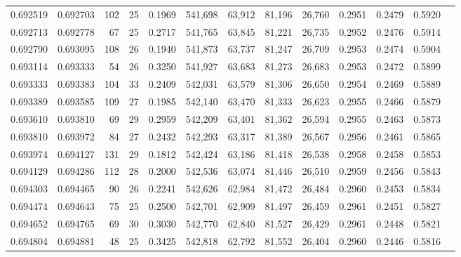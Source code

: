 \begin{tabular}{rrrrrrrrrrrrr}
0.692519 & 0.692703 &    102 &    25 &                                     0.1969 & 541,698 &  63,912 &  81,196 &  26,760 & 0.2951 & 0.2479 & 0.5920 \\
0.692713 & 0.692778 &     67 &    25 &                                     0.2717 & 541,765 &  63,845 &  81,221 &  26,735 & 0.2952 & 0.2476 & 0.5914 \\
0.692790 & 0.693095 &    108 &    26 &                                     0.1940 & 541,873 &  63,737 &  81,247 &  26,709 & 0.2953 & 0.2474 & 0.5904 \\
0.693114 & 0.693333 &     54 &    26 &                                     0.3250 & 541,927 &  63,683 &  81,273 &  26,683 & 0.2953 & 0.2472 & 0.5899 \\
0.693333 & 0.693383 &    104 &    33 &                                     0.2409 & 542,031 &  63,579 &  81,306 &  26,650 & 0.2954 & 0.2469 & 0.5889 \\
0.693389 & 0.693585 &    109 &    27 &                                     0.1985 & 542,140 &  63,470 &  81,333 &  26,623 & 0.2955 & 0.2466 & 0.5879 \\
0.693610 & 0.693810 &     69 &    29 &                                     0.2959 & 542,209 &  63,401 &  81,362 &  26,594 & 0.2955 & 0.2463 & 0.5873 \\
0.693810 & 0.693972 &     84 &    27 &                                     0.2432 & 542,293 &  63,317 &  81,389 &  26,567 & 0.2956 & 0.2461 & 0.5865 \\
0.693974 & 0.694127 &    131 &    29 &                                     0.1812 & 542,424 &  63,186 &  81,418 &  26,538 & 0.2958 & 0.2458 & 0.5853 \\
0.694129 & 0.694286 &    112 &    28 &                                     0.2000 & 542,536 &  63,074 &  81,446 &  26,510 & 0.2959 & 0.2456 & 0.5843 \\
0.694303 & 0.694465 &     90 &    26 &                                     0.2241 & 542,626 &  62,984 &  81,472 &  26,484 & 0.2960 & 0.2453 & 0.5834 \\
0.694474 & 0.694643 &     75 &    25 &                                     0.2500 & 542,701 &  62,909 &  81,497 &  26,459 & 0.2961 & 0.2451 & 0.5827 \\
0.694652 & 0.694765 &     69 &    30 &                                     0.3030 & 542,770 &  62,840 &  81,527 &  26,429 & 0.2961 & 0.2448 & 0.5821 \\
0.694804 & 0.694881 &     48 &    25 &                                     0.3425 & 542,818 &  62,792 &  81,552 &  26,404 & 0.2960 & 0.2446 & 0.5816 \\

\end{tabular}
